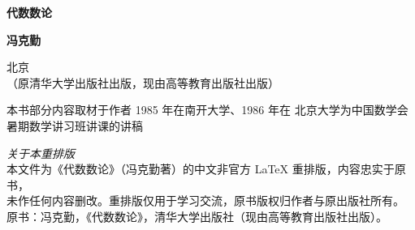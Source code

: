 \begin{titlepage}
    \begin{center}
        \vspace*{2.5cm}
        {\Huge\bfseries 代数数论\par}
        \vspace{1.2cm}
        {\Large\bfseries 冯克勤\par}
        \vspace{0.6cm}
        {\large 北京\\[0.2em]
         （原清华大学出版社出版，现由高等教育出版社出版）\par}
        \vspace{2cm}
        {\large 本书部分内容取材于作者 1985 年在南开大学、1986 年在
         北京大学为中国数学会暑期数学讲习班讲课的讲稿\par}
    \end{center}
\end{titlepage}

\thispagestyle{empty}
\begin{center}
    \small
    \noindent\emph{关于本重排版}\\[0.5em]
    本文件为《代数数论》（冯克勤著）的中文非官方 \LaTeX{} 重排版，内容忠实于原书，\\
    未作任何内容删改。重排版仅用于学习交流，原书版权归作者与原出版社所有。\\
    \vspace{0.5cm}
    原书：冯克勤，《代数数论》，清华大学出版社（现由高等教育出版社出版）。
\end{center}
